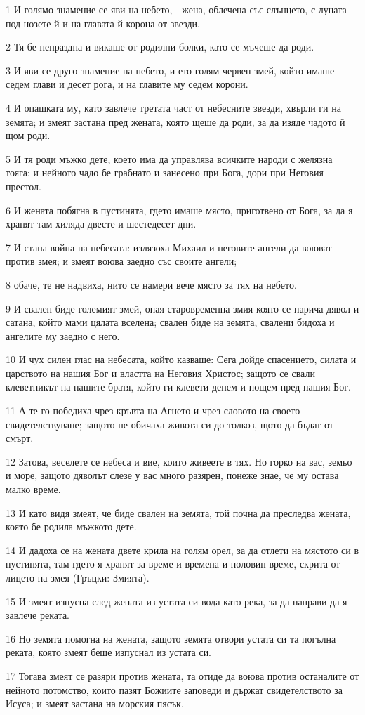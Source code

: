 \par 1 И голямо знамение се яви на небето, - жена, облечена със слънцето, с луната под нозете й и на главата й корона от звезди.
\par 2 Тя бе непраздна и викаше от родилни болки, като се мъчеше да роди.
\par 3 И яви се друго знамение на небето, и ето голям червен змей, който имаше седем глави и десет рога, и на главите му седем корони.
\par 4 И опашката му, като завлече третата част от небесните звезди, хвърли ги на земята; и змеят застана пред жената, която щеше да роди, за да изяде чадото й щом роди.
\par 5 И тя роди мъжко дете, което има да управлява всичките народи с желязна тояга; и нейното чадо бе грабнато и занесено при Бога, дори при Неговия престол.
\par 6 И жената побягна в пустинята, гдето имаше място, приготвено от Бога, за да я хранят там хиляда двесте и шестедесет дни.
\par 7 И стана война на небесата: излязоха Михаил и неговите ангели да воюват против змея; и змеят воюва заедно със своите ангели;
\par 8 обаче, те не надвиха, нито се намери вече място за тях на небето.
\par 9 И свален биде големият змей, оная старовременна змия която се нарича дявол и сатана, който мами цялата вселена; свален биде на земята, свалени бидоха и ангелите му заедно с него.
\par 10 И чух силен глас на небесата, който казваше: Сега дойде спасението, силата и царството на нашия Бог и властта на Неговия Христос; защото се свали клеветникът на нашите братя, който ги клевети денем и нощем пред нашия Бог.
\par 11 А те го победиха чрез кръвта на Агнето и чрез словото на своето свидетелствуване; защото не обичаха живота си до толкоз, щото да бъдат от смърт.
\par 12 Затова, веселете се небеса и вие, които живеете в тях. Но горко на вас, земьо и море, защото дяволът слезе у вас много разярен, понеже знае, че му остава малко време.
\par 13 И като видя змеят, че биде свален на земята, той почна да преследва жената, която бе родила мъжкото дете.
\par 14 И дадоха се на жената двете крила на голям орел, за да отлети на мястото си в пустинята, там гдето я хранят за време и времена и половин време, скрита от лицето на змея (Гръцки: Змията).
\par 15 И змеят изпусна след жената из устата си вода като река, за да направи да я завлече реката.
\par 16 Но земята помогна на жената, защото земята отвори устата си та погълна реката, която змеят беше изпуснал из устата си.
\par 17 Тогава змеят се разяри против жената, та отиде да воюва против останалите от нейното потомство, които пазят Божиите заповеди и държат свидетелството за Исуса; и змеят застана на морския пясък.

